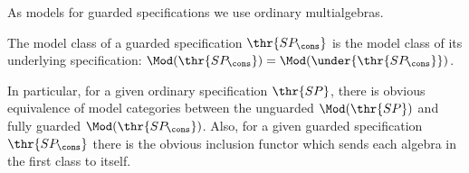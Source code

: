 As models for guarded specifications we use ordinary multialgebras.
\begin{definition}
The model class of a guarded specification $\thr{SP_\cons}$ is the
model class of its underlying specification: $\Mod(\thr{SP_\cons}) = \Mod(\under{\thr{SP_\cons}})$.
\end{definition}
In particular, for a given ordinary specification $\thr{SP}$, there is obvious equivalence of
model categories between the unguarded $\Mod(\thr{SP})$ and fully guarded $\Mod(\thr{SP_\cons})$.
Also, for a given guarded specification $\thr{SP_\cons}$ there is the obvious
inclusion functor
which sends each algebra in the first class to itself.
%




